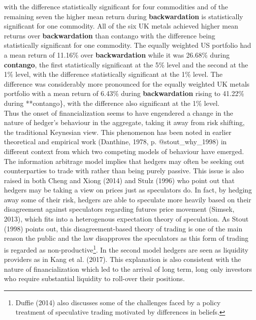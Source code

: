 \documentclass[]{elsarticle} %
\begin{document}
with the difference statistically significant for four commodities and
of the remaining seven the higher mean return during
\textbf{backwardation} is statistically significant for one commodity.
All of the six UK metals achieved higher mean returns over
\textbf{backwardation} than contango with the difference being
statistically significant for one commodity. The equally weighted US
portfolio had a mean return of 11.16\% over \textbf{backwardation} while
it was 26.68\% during \textbf{contango}, the first statistically
significant at the 5\% level and the second at the 1\% level, with the
difference statistically significant at the 1\% level. The difference
was considerably more pronounced for the equally weighted UK metals
portfolio with a mean return of 6.43\% during \textbf{backwardation}
rising to 41.22\% during **contango\}, with the difference also
significant at the 1\% level.\\
Thus the onset of financialization seems to have engendered a change in
the nature of hedger's behaviour in the aggregate, taking it away from
risk shifting, the traditional Keynesian view. This phenomenon has been
noted in earlier theoretical and empirical work (Danthine, 1978, p.
@stout\_why\_1998) in different context from which two competing models
of behaviour have emerged. The information arbitrage model implies that
hedgers may often be seeking out counterparties to trade with rather
than being purely passive. This issue is also raised in both Cheng and
Xiong (2014) and Stulz (1996) who point out that hedgers may be taking a
view on prices just as speculators do. In fact, by hedging away some of
their risk, hedgers are able to speculate more heavily based on their
disagreement against speculators regarding futures price movement
(Simsek, 2013), which fits into a heterogenous expectation theory of
speculation. As Stout (1998) points out, this disagreement-based theory
of trading is one of the main reason the public and the law disapproves
the speculators as this form of trading is regarded as
non-productive\footnote{Duffie (2014) also discusses some of the
  challenges faced by a policy treatment of speculative trading
  motivated by differences in beliefs.}. In the second model hedgers are
seen as liquidity providers as in Kang et al. (2017). This explanation
is also consistent with the nature of financialization which led to the
arrival of long term, long only investors who require substantial
liquidity to roll-over their positions.
\end{document}
